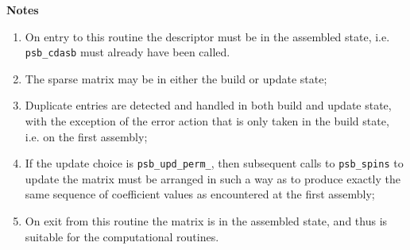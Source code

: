 {\par\noindent\large\bfseries Notes}
\begin{enumerate}
\item On entry to this routine the descriptor must  be in  the
  assembled state, i.e. \verb|psb_cdasb| must already have been called.
\item The sparse matrix may be in either the build or update state;
\item Duplicate entries are detected and handled in both build and
  update state, with the exception of the error action that is only
  taken in the build state, i.e. on the first assembly; 
\item If the update choice is \verb|psb_upd_perm_|, then subsequent
  calls to \verb|psb_spins| to update the matrix must be arranged in
  such a way as to produce exactly the same sequence of coefficient
  values as encountered at the first assembly; 
\item On exit from this routine the matrix is in the assembled state,
  and thus is suitable for the computational routines. 
\end{enumerate}









